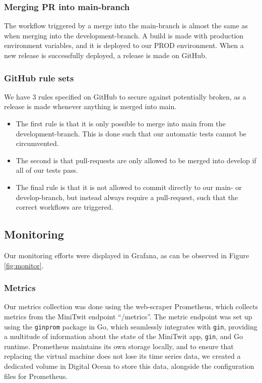\subsubsection*{Merging PR into main-branch}
The workflow triggered by a merge into the main-branch is almost the same as when merging into the development-branch. A build is made with production environment variables, and it is deployed to our PROD environment. When a new release is successfully deployed, a release is made on GitHub.

\subsubsection*{GitHub rule sets}
We have 3 rules specified on GitHub to secure against potentially broken, as a release is made whenever anything is merged into main. 

\begin{itemize}
    \item The first rule is that it is only possible to merge into main from the development-branch. This is done such that our automatic tests cannot be circumvented.
    \item The second is that pull-requests are only allowed to be merged into develop if all of our tests pass.
    \item The final rule is that it is not allowed to commit directly to our main- or develop-branch, but instead always require a pull-request, such that the correct workflows are triggered.
\end{itemize}
\subsection{Monitoring}
 Our monitoring efforts were displayed in Grafana, as can be observed in Figure \ref{fig:monitor}.
\subsubsection{Metrics}
Our metrics collection was done using the web-scraper Prometheus, which collects metrics from the MiniTwit endpoint “/metrics”. The metric endpoint was set up using the \texttt{ginprom} package in Go, which seamlessly integrates with \texttt{gin}, providing a multitude of information about the state of the MiniTwit app, \texttt{gin}, and Go runtime. Prometheus maintains its own storage locally, and to ensure that replacing the virtual machine does not lose its time series data, we created a dedicated volume in Digital Ocean to store this data, alongside the configuration files for Prometheus. 


